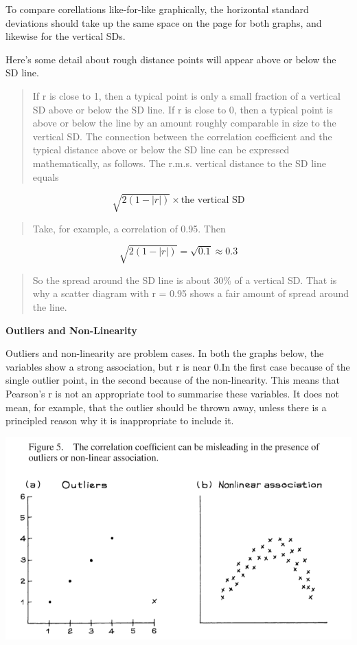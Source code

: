 \documentclass[
]{book}
\begin{document}
To compare corellations like-for-like graphically, the horizontal standard deviations should take up the same space on the page for both graphs, and likewise for the vertical SDs.

Here's some detail about rough distance points will appear above or below the SD line.

\begin{quote}
If r is close to 1, then a typical point is only a small fraction of a vertical SD above or below the SD line. If r is close to 0, then a typical point is above or below the line by an amount roughly comparable in size to the vertical SD.
The connection between the correlation coefficient and the typical distance above or below the SD line can be expressed mathematically, as follows.
The r.m.s. vertical distance to the SD line equals
\end{quote}

\[
\sqrt{2(1-|r|)} \times\text{the vertical SD}
\]

\begin{quote}
Take, for example, a correlation of 0.95. Then
\end{quote}

\[
\sqrt{2(1-|r|)} = \sqrt{0.1} \approx 0.3
\]

\begin{quote}
So the spread around the SD line is about 30\% of a vertical SD. That is why a scatter diagram with r = 0.95 shows a fair amount of spread around the line.
\end{quote}

\textbf{Outliers and Non-Linearity}

Outliers and non-linearity are problem cases. In both the graphs below, the variables show a strong association, but r is near 0.In the first case because of the single outlier point, in the second because of the non-linearity. This means that Pearson's r is not an appropriate tool to summarise these variables. It does not mean, for example, that the outlier should be thrown away, unless there is a principled reason why it is inappropriate to include it.

\includegraphics{images/Ch09Img02.png}
\end{document}
